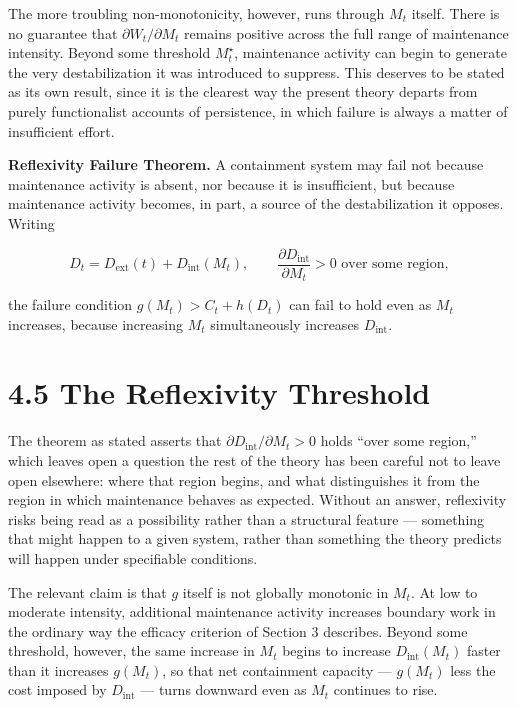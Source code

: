 \documentclass[11pt]{article}
\theoremstyle{plain}
\begin{document}
The more troubling non-monotonicity, however, runs through \(M_t\) itself. There is no guarantee that \(\partial W_t/\partial M_t\) remains positive across the full range of maintenance intensity. Beyond some threshold \(M_t^\star\), maintenance activity can begin to generate the very destabilization it was introduced to suppress. This deserves to be stated as its own result, since it is the clearest way the present theory departs from purely functionalist accounts of persistence, in which failure is always a matter of insufficient effort.

\textbf{Reflexivity Failure Theorem.} A containment system may fail not because maintenance activity is absent, nor because it is insufficient, but because maintenance activity becomes, in part, a source of the destabilization it opposes. Writing

\[D_t = D_{\mathrm{ext}}(t) + D_{\mathrm{int}}(M_t), \qquad \frac{\partial D_{\mathrm{int}}}{\partial M_t} > 0 \text{ over some region},\]

the failure condition \(g(M_t) > C_t + h(D_t)\) can fail to hold even as \(M_t\) increases, because increasing \(M_t\) simultaneously increases \(D_{\mathrm{int}}\).

\section*{4.5 The Reflexivity Threshold}

The theorem as stated asserts that \(\partial D_{\mathrm{int}}/\partial M_t > 0\) holds ``over some region,'' which leaves open a question the rest of the theory has been careful not to leave open elsewhere: where that region begins, and what distinguishes it from the region in which maintenance behaves as expected. Without an answer, reflexivity risks being read as a possibility rather than a structural feature --- something that might happen to a given system, rather than something the theory predicts will happen under specifiable conditions.

The relevant claim is that \(g\) itself is not globally monotonic in \(M_t\). At low to moderate intensity, additional maintenance activity increases boundary work in the ordinary way the efficacy criterion of Section 3 describes. Beyond some threshold, however, the same increase in \(M_t\) begins to increase \(D_{\mathrm{int}}(M_t)\) faster than it increases \(g(M_t)\), so that net containment capacity --- \(g(M_t)\) less the cost imposed by \(D_{\mathrm{int}}\) --- turns downward even as \(M_t\) continues to rise.
\end{document}
